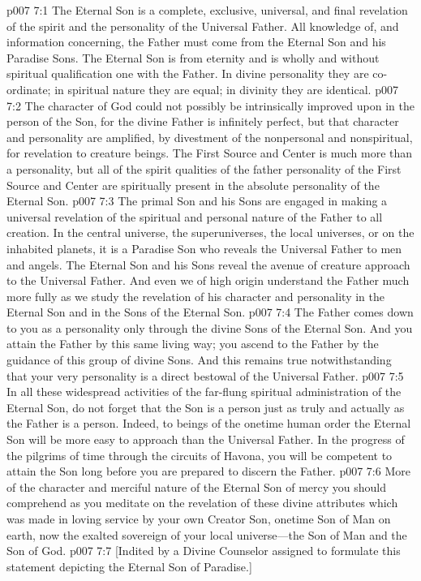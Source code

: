 \vs p007 7:1 The Eternal Son is a complete, exclusive, universal, and final revelation of the spirit and the personality of the Universal Father. All knowledge of, and information concerning, the Father must come from the Eternal Son and his Paradise Sons. The Eternal Son is from eternity and is wholly and without spiritual qualification one with the Father. In divine personality they are co\hyp{}ordinate; in spiritual nature they are equal; in divinity they are identical.
\vs p007 7:2 The character of God could not possibly be intrinsically improved upon in the person of the Son, for the divine Father is infinitely perfect, but that character and personality are amplified, by divestment of the nonpersonal and nonspiritual, for revelation to creature beings. The First Source and Center is much more than a personality, but all of the spirit qualities of the father personality of the First Source and Center are spiritually present in the absolute personality of the Eternal Son.
\vs p007 7:3 The primal Son and his Sons are engaged in making a universal revelation of the spiritual and personal nature of the Father to all creation. In the central universe, the superuniverses, the local universes, or on the inhabited planets, it is a Paradise Son who reveals the Universal Father to men and angels. The Eternal Son and his Sons reveal the avenue of creature approach to the Universal Father. And even we of high origin understand the Father much more fully as we study the revelation of his character and personality in the Eternal Son and in the Sons of the Eternal Son.
\vs p007 7:4 The Father comes down to you as a personality only through the divine Sons of the Eternal Son. And you attain the Father by this same living way; you ascend to the Father by the guidance of this group of divine Sons. And this remains true notwithstanding that your very personality is a direct bestowal of the Universal Father.
\pc \vs p007 7:5 In all these widespread activities of the far\hyp{}flung spiritual administration of the Eternal Son, do not forget that the Son is a person just as truly and actually as the Father is a person. Indeed, to beings of the onetime human order the Eternal Son will be more easy to approach than the Universal Father. In the progress of the pilgrims of time through the circuits of Havona, you will be competent to attain the Son long before you are prepared to discern the Father.
\vs p007 7:6 More of the character and merciful nature of the Eternal Son of mercy you should comprehend as you meditate on the revelation of these divine attributes which was made in loving service by your own Creator Son, onetime Son of Man on earth, now the exalted sovereign of your local universe---the Son of Man and the Son of God.
\vsetoff
\vs p007 7:7 [Indited by a Divine Counselor assigned to formulate this statement depicting the Eternal Son of Paradise.]
